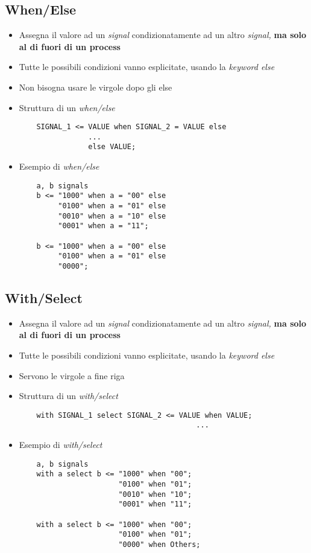 \documentclass{article}
\begin{document}
\subsection{When/Else}
\begin{itemize}
  \item Assegna il valore ad un \textit{signal} condizionatamente ad un altro \textit{signal,} \textbf{ma solo al di fuori di un process}
  \item Tutte le possibili condizioni vanno esplicitate, usando la \textit{keyword else}
  \item Non bisogna usare le virgole dopo gli else
  \item Struttura di un \textit{when/else}
        \begin{verbatim}
    SIGNAL_1 <= VALUE when SIGNAL_2 = VALUE else
                ...
                else VALUE;
	      \end{verbatim}

        \newpage

  \item Esempio di \textit{when/else}
        \begin{verbatim}
    a, b signals
    b <= "1000" when a = "00" else
         "0100" when a = "01" else
         "0010" when a = "10" else
         "0001" when a = "11";

    b <= "1000" when a = "00" else
         "0100" when a = "01" else
         "0000";
	      \end{verbatim}
\end{itemize}

\subsection{With/Select}
\begin{itemize}
  \item Assegna il valore ad un \textit{signal} condizionatamente ad un altro \textit{signal, } \textbf{ma solo al di fuori di un process}
  \item Tutte le possibili condizioni vanno esplicitate, usando la \textit{keyword else}
  \item Servono le virgole a fine riga
  \item Struttura di un \textit{with/select}
        \begin{verbatim}
    with SIGNAL_1 select SIGNAL_2 <= VALUE when VALUE;
                                         ...
	      \end{verbatim}
  \item Esempio di \textit{with/select}
        \begin{verbatim}
    a, b signals
    with a select b <= "1000" when "00";
                       "0100" when "01";
                       "0010" when "10";
                       "0001" when "11";

    with a select b <= "1000" when "00";
                       "0100" when "01";
                       "0000" when Others;
	      \end{verbatim}
\end{itemize}
\end{document}
